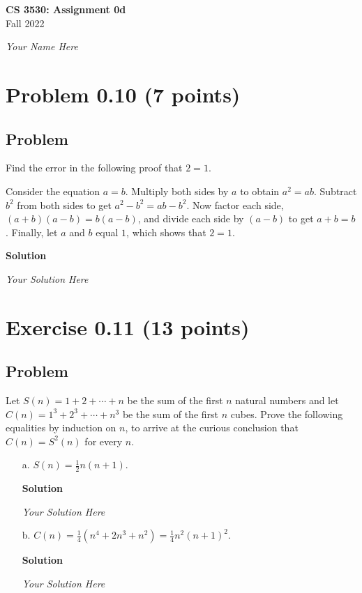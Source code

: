 \documentclass{article}
\begin{document}
\begin{empfile}

\begin{center}
\textbf{\Large CS 3530: Assignment 0d} \\[2mm]
Fall 2022

\emph{Your Name Here}
\end{center}

\raggedright

\section*{Problem 0.10 (7 points)}

\subsection*{Problem}

Find the error in the following proof that $2 = 1$.

Consider the equation $a = b$.  Multiply both sides by $a$ to obtain $a^2 = ab$.  Subtract
$b^2$ from both sides to get $a^2 - b^2 = ab - b^2$.  Now factor each side, $(a + b)(a - b) = b(a-b)$,
and divide each side by $(a - b)$ to get $a + b = b$.  Finally, let $a$ and $b$ equal $1$, which shows
that $2 = 1$.

\textbf{Solution}

\emph{Your Solution Here}

\section*{Exercise 0.11 (13 points)}

\subsection*{Problem}

Let $S(n) = 1 + 2 + \cdots + n$ be the sum of the first $n$ natural numbers and let
$C(n) = 1^3 + 2^3 + \cdots + n^3$ be the sum of the first $n$ cubes.  Prove the following equalities
by induction on $n$, to arrive at the curious conclusion that $C(n) = S^2(n)$ for every $n$.

\begin{itemize}
\item[a.] $S(n) = \frac{1}{2}n(n+1)$.
  
\textbf{Solution}

\emph{Your Solution Here}

\item[b.] $C(n) = \frac{1}{4}(n^4 + 2n^3 + n^2) = \frac{1}{4}n^2(n+1)^2 $.
  
\textbf{Solution}

\emph{Your Solution Here}

\end{itemize}
  
\end{empfile}
\immediate{}
\end{document}
